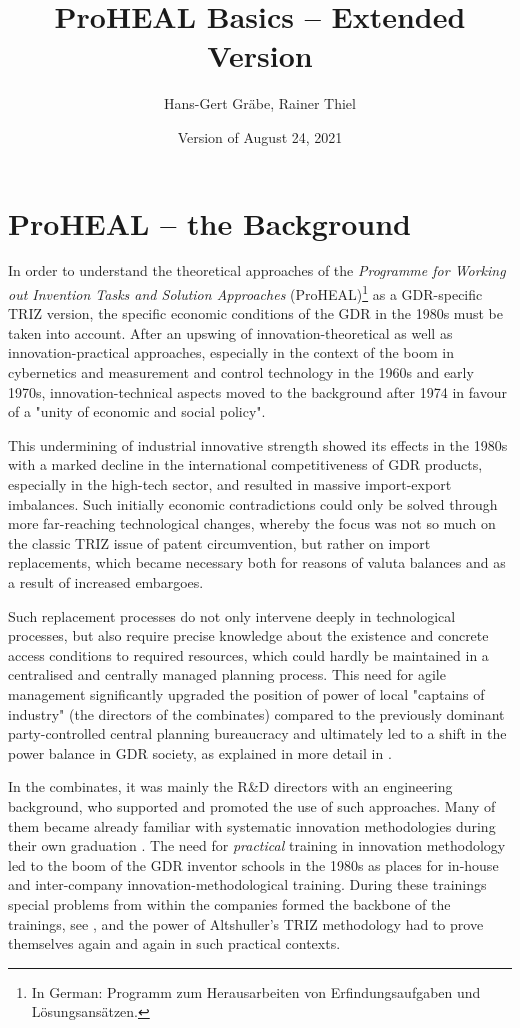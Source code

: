 \documentclass[11pt,a4paper]{article}
\title{ProHEAL Basics -- Extended Version}
\author{Hans-Gert Gr\"abe, Rainer Thiel}
\date{Version of August 24, 2021}
\begin{document}
\maketitle

\section{ProHEAL -- the Background}

In order to understand the theoretical approaches of the \emph{Programme for
  Working out Invention Tasks and Solution Approaches} (ProHEAL)\footnote{In
  German: Programm zum Herausarbeiten von Erfindungsaufgaben und
  Lösungsansätzen. } as a GDR-specific TRIZ version, the specific economic
conditions of the GDR in the 1980s must be taken into account. After an
upswing of innovation-theoretical as well as innovation-practical approaches,
especially in the context of the boom in cybernetics and measurement and
control technology in the 1960s and early 1970s, innovation-technical aspects
moved to the background after 1974 in favour of a "unity of economic and
social policy".

This undermining of industrial innovative strength showed its effects in the
1980s with a marked decline in the international competitiveness of GDR
products, especially in the high-tech sector, and resulted in massive
import-export imbalances. Such initially economic contradictions could only be
solved through more far-reaching technological changes, whereby the focus was
not so much on the classic TRIZ issue of patent circumvention, but rather on
import replacements, which became necessary both for reasons of valuta
balances and as a result of increased embargoes.

Such replacement processes do not only intervene deeply in technological
processes, but also require precise knowledge about the existence and concrete
access conditions to required resources, which could hardly be maintained in a
centralised and centrally managed planning process. This need for agile
management significantly upgraded the position of power of local "captains of
industry" (the directors of the combinates) compared to the previously
dominant party-controlled central planning bureaucracy and ultimately led to a
shift in the power balance in GDR society, as explained in more detail in
\cite{Barkleit}.

In the combinates, it was mainly the R\&D directors with an engineering
background, who supported and promoted the use of such approaches.  Many of
them became already familiar with systematic innovation methodologies during
their own graduation \cite{RM-23}. The need for \emph{practical} training in
innovation methodology led to the boom of the GDR inventor schools in the
1980s as places for in-house and inter-company innovation-methodological
training.  During these trainings special problems from within the companies
formed the backbone of the trainings, see \cite[part 1, ch. 3]{RT94}, and the
power of Altshuller's TRIZ methodology had to prove themselves again and again
in such practical contexts.
\end{document}
